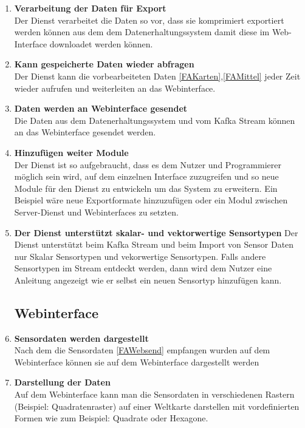 \begin{enumerate}[label=\textbf{PF\arabic{enumi}0}]
	\item \textbf{Verarbeitung der Daten für Export}\\
		Der Dienst verarbeitet die Daten so vor, dass sie komprimiert exportiert werden können aus dem dem Datenerhaltungssystem damit diese im Web-Interface downloadet werden können.
	
	\item \textbf{Kann gespeicherte Daten wieder abfragen}\\
		Der Dienst kann die vorbearbeiteten Daten  \ref{FAKarten},\ref{FAMittel} jeder Zeit wieder aufrufen und weiterleiten an das Webinterface.
		
	\item \textbf{Daten werden an Webinterface gesendet} \label{FAWebsend}\\
		Die Daten aus dem Datenerhaltungssystem und vom Kafka Stream können an das Webinterface gesendet werden.
	 	
	 \item \textbf{Hinzufügen weiter Module}\\
		 Der Dienst ist so aufgebraucht, dass es dem Nutzer und Programmierer möglich sein wird, auf dem einzelnen Interface zuzugreifen und so neue Module für den Dienst zu entwickeln um das System zu erweitern. Ein Beispiel wäre neue Exportformate hinzuzufügen oder ein Modul zwischen Server-Dienst und Webinterfaces zu setzten. 
	 
	 \item \textbf{Der Dienst unterstützt skalar- und vektorwertige Sensortypen}
	 	Der Dienst unterstützt beim Kafka Stream und beim Import von Sensor Daten nur Skalar Sensortypen und vekorwertige Sensortypen. Falls andere Sensortypen im Stream entdeckt werden, dann wird dem Nutzer eine Anleitung angezeigt wie er selbst ein neuen Sensortyp hinzufügen kann.
 
	 \subsection{Webinterface}

	 \item \textbf{Sensordaten werden dargestellt}\\
	 	Nach dem die Sensordaten \ref{FAWebsend} empfangen wurden auf dem Webinterface können sie auf dem Webinterface dargestellt werden
	 
	 \item \textbf{Darstellung der Daten}\\
	 	Auf dem Webinterface kann man die Sensordaten in verschiedenen Rastern (Beispiel: Quadratenraster) auf einer Weltkarte darstellen mit vordefinierten Formen wie zum Beispiel: Quadrate oder Hexagone.
	 

\end{enumerate}

